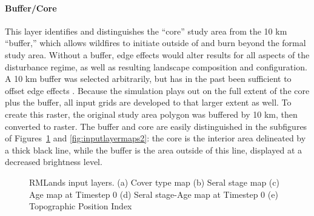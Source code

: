 \paragraph*{Buffer/Core} 
This layer identifies and distinguishes the ``core'' study area from the 10 km ``buffer,'' which allows wildfires to initiate outside of and burn beyond the formal study area. Without a buffer, edge effects would alter results for all aspects of the disturbance regime, as well as resulting landscape composition and configuration. A 10 km buffer was selected arbitrarily, but has in the past been sufficient to offset edge effects \citep{Cushman2011}. Because the simulation plays out on the full extent of the core plus the buffer, all input grids are developed to that larger extent as well. To create this raster, the original study area polygon was buffered by 10 km, then converted to raster. The buffer and core are easily distinguished in the subfigures of Figures~\ref{fig:inputlayermaps1} and \ref{fig:inputlayermaps2}: the core is the interior area delineated by a thick black line, while the buffer is the area outside of this line, displayed at a decreased brightness level.


\begin{figure}[!htbp]
  \centering
   \qquad
	 \qquad
  \caption{RMLands input layers. (a) Cover type map (b) Seral stage map (c) Age map at Timestep 0 (d) Seral stage-Age map at Timestep 0 (e) Topographic Position Index}
  \label{fig:inputlayermaps1}
\end{figure}

